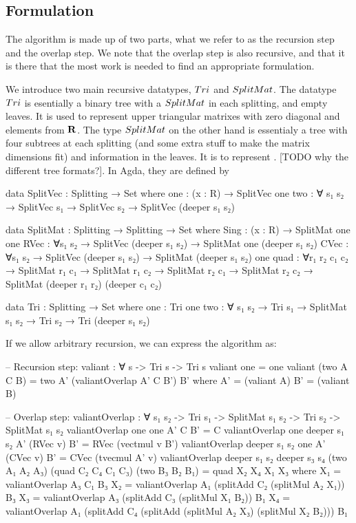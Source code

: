 \documentclass{article}
\begin{document}
\subsection{Formulation}
The algorithm is made up of two parts, what we refer to as the recursion step and the overlap step. We note that the overlap step is also recursive, and that it is there that the most work is needed to find an appropriate formulation.

We introduce two main recursive datatypes, $Tri$ and $SplitMat$. 
The datatype $Tri$ is esentially a binary tree with a $SplitMat$ in each splitting, and empty leaves. It is used to represent upper triangular matrixes with zero diagonal and elements from $\mathbf{R}$.
The type $SplitMat$ on the other hand is essentialy a tree with four subtrees at each splitting (and some extra stuff to make the matrix dimensions fit) and information in the leaves. It is to represent 
. [TODO why the different tree formats?].
In Agda, they are defined by

\begin{code}
data SplitVec : Splitting → Set where
  one : (x : R)   → SplitVec one
  two : ∀ {s₁ s₂} → SplitVec s₁  → SplitVec s₂ → SplitVec (deeper s₁ s₂)

data SplitMat : Splitting → Splitting → Set where
  Sing : (x : R)  → SplitMat one one
  RVec : ∀{s₁ s₂} → SplitVec (deeper s₁ s₂) → SplitMat one (deeper s₁ s₂)
  CVec : ∀{s₁ s₂} → SplitVec (deeper s₁ s₂) → SplitMat (deeper s₁ s₂) one
  quad : ∀{r₁ r₂ c₁ c₂} → SplitMat r₁ c₁ → SplitMat r₁ c₂ → 
                          SplitMat r₂ c₁ → SplitMat r₂ c₂ → 
                          SplitMat (deeper r₁ r₂) (deeper c₁ c₂)

data Tri : Splitting → Set where
  one : Tri one
  two : ∀ {s₁ s₂} → Tri s₁ → SplitMat s₁ s₂ → 
                             Tri s₂ → 
                    Tri (deeper s₁ s₂)
\end{code}

If we allow arbitrary recursion, we can express the algorithm as:

\begin{code}
-- Recursion step:
valiant : ∀ {s} -> Tri s -> Tri s
valiant one = one
valiant (two A C B) = two A' (valiantOverlap A' C B') B'
  where A' = (valiant A)
        B' = (valiant B)

-- Overlap step:
valiantOverlap : ∀ {s₁ s₂} -> Tri s₁ -> SplitMat s₁ s₂ -> Tri s₂ -> SplitMat s₁ s₂
valiantOverlap {one} {one} A' C B' = C
valiantOverlap {one} {deeper s₁ s₂} A' (RVec v) B' = RVec (vectmul v B')
valiantOverlap {deeper s₁ s₂} {one} A' (CVec v) B' = CVec (tvecmul A' v)
valiantOverlap {deeper s₁ s₂} {deeper s₃ s₄} (two A₁ A₂ A₃) (quad C₂ C₄ C₁ C₃) (two B₃ B₂ B₁) = quad X₂ X₄ X₁ X₃
  where X₁ = valiantOverlap A₃ C₁ B₃
        X₂ = valiantOverlap A₁ (splitAdd C₂ (splitMul A₂ X₁)) B₃
        X₃ = valiantOverlap A₃ (splitAdd C₃ (splitMul X₁ B₂)) B₁
        X₄ = valiantOverlap A₁ (splitAdd C₄ (splitAdd (splitMul A₂ X₃) (splitMul X₂ B₂))) B₁
\end{code}
\end{document}
